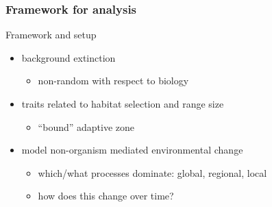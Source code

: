 \documentclass{beamer}
\begin{document}
\begin{frame}
  \frametitle{Framework for analysis}

  \begin{block}{Framework and setup}
    \begin{itemize}
      \item background extinction
        \begin{itemize}
          \item non-random with respect to biology
        \end{itemize}
      \item traits related to habitat selection and range size
        \begin{itemize}
          \item ``bound'' adaptive zone
        \end{itemize}
      \item model non-organism mediated environmental change
        \begin{itemize}
          \item which/what processes dominate: global, regional, local
          \item how does this change over time?
        \end{itemize}
    \end{itemize}
  \end{block}
\end{frame}
\end{document}
